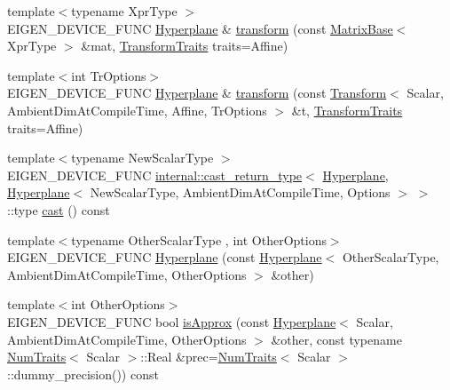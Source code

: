 \begin{DoxyCompactItemize}
\item 
{\footnotesize template$<$typename Xpr\+Type $>$ }\\E\+I\+G\+E\+N\+\_\+\+D\+E\+V\+I\+C\+E\+\_\+\+F\+U\+NC \mbox{\hyperlink{class_eigen_1_1_hyperplane}{Hyperplane}} \& \mbox{\hyperlink{class_eigen_1_1_hyperplane_a44d7ad009a496f78636ce69f611f2003}{transform}} (const \mbox{\hyperlink{class_eigen_1_1_matrix_base}{Matrix\+Base}}$<$ Xpr\+Type $>$ \&mat, \mbox{\hyperlink{group__enums_gaee59a86102f150923b0cac6d4ff05107}{Transform\+Traits}} traits=Affine)
\item 
{\footnotesize template$<$int Tr\+Options$>$ }\\E\+I\+G\+E\+N\+\_\+\+D\+E\+V\+I\+C\+E\+\_\+\+F\+U\+NC \mbox{\hyperlink{class_eigen_1_1_hyperplane}{Hyperplane}} \& \mbox{\hyperlink{class_eigen_1_1_hyperplane_a1705f330bad337dc4a62814b5f9c4af1}{transform}} (const \mbox{\hyperlink{class_eigen_1_1_transform}{Transform}}$<$ Scalar, Ambient\+Dim\+At\+Compile\+Time, Affine, Tr\+Options $>$ \&t, \mbox{\hyperlink{group__enums_gaee59a86102f150923b0cac6d4ff05107}{Transform\+Traits}} traits=Affine)
\item 
{\footnotesize template$<$typename New\+Scalar\+Type $>$ }\\E\+I\+G\+E\+N\+\_\+\+D\+E\+V\+I\+C\+E\+\_\+\+F\+U\+NC \mbox{\hyperlink{struct_eigen_1_1internal_1_1cast__return__type}{internal\+::cast\+\_\+return\+\_\+type}}$<$ \mbox{\hyperlink{class_eigen_1_1_hyperplane}{Hyperplane}}, \mbox{\hyperlink{class_eigen_1_1_hyperplane}{Hyperplane}}$<$ New\+Scalar\+Type, Ambient\+Dim\+At\+Compile\+Time, Options $>$ $>$\+::type \mbox{\hyperlink{class_eigen_1_1_hyperplane_aa3b0071864745e33f3a7b75bb308bd46}{cast}} () const
\item 
{\footnotesize template$<$typename Other\+Scalar\+Type , int Other\+Options$>$ }\\E\+I\+G\+E\+N\+\_\+\+D\+E\+V\+I\+C\+E\+\_\+\+F\+U\+NC \mbox{\hyperlink{class_eigen_1_1_hyperplane_ad4c2c28d6a4c74218c788094ed072264}{Hyperplane}} (const \mbox{\hyperlink{class_eigen_1_1_hyperplane}{Hyperplane}}$<$ Other\+Scalar\+Type, Ambient\+Dim\+At\+Compile\+Time, Other\+Options $>$ \&other)
\item 
{\footnotesize template$<$int Other\+Options$>$ }\\E\+I\+G\+E\+N\+\_\+\+D\+E\+V\+I\+C\+E\+\_\+\+F\+U\+NC bool \mbox{\hyperlink{class_eigen_1_1_hyperplane_a544f8466e85e4b95e1848dccf6015d23}{is\+Approx}} (const \mbox{\hyperlink{class_eigen_1_1_hyperplane}{Hyperplane}}$<$ Scalar, Ambient\+Dim\+At\+Compile\+Time, Other\+Options $>$ \&other, const typename \mbox{\hyperlink{struct_eigen_1_1_num_traits}{Num\+Traits}}$<$ Scalar $>$\+::Real \&prec=\mbox{\hyperlink{struct_eigen_1_1_num_traits}{Num\+Traits}}$<$ Scalar $>$\+::dummy\+\_\+precision()) const
\end{DoxyCompactItemize}
